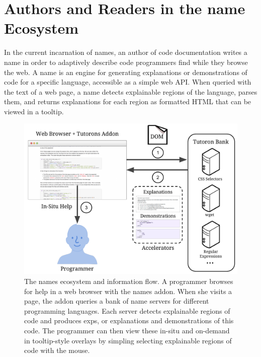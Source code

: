 \section{Authors and Readers in the \Gls{name} Ecosystem}

In the current incarnation of \glspl{name}, an author of code documentation writes a \gls{name} in order to adaptively describe  code programmers find while they browse the web.
A \gls{name} is an engine for generating explanations or demonstrations of code for a specific language, accessible as a simple web API.
When queried with the text of a web page, a \gls{name} detects explainable regions of the language, parses them, and returns explanations for each region as formatted HTML that can be viewed in a tooltip.

\begin{figure}
    \includegraphics[width=\columnwidth]{figures/tutoron_ecosystem}
    \caption{
    The \Glspl{name} ecosystem and information flow.
    A programmer browses for help in a web browser with the \Glspl{name} addon.
    When she visits a page, the addon queries a bank of \gls{name} servers for different programming languages.
    Each server detects explainable regions of code and produces \glspl{exp}, or explanations and demonstrations of this code.
    The programmer can then view these in-situ and on-demand in tooltip-style overlays by simpling selecting explainable regions of code with the mouse.
    }
    \label{fig:tutoron_ecosystem}
\end{figure}

